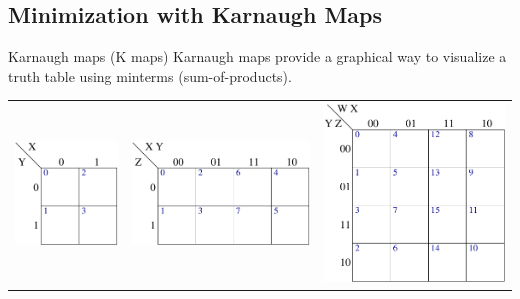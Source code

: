\subsection{Minimization with Karnaugh Maps}

\begin{frame}{Karnaugh maps (K maps)}
  Karnaugh maps provide a graphical way to visualize a truth table using minterms (sum-of-products).\\
  \begin{center}
    \begin{tabular}{ccc}
      \includegraphics[scale=0.5]{2VariableKMap} & \includegraphics[scale=0.5]{3VariableKMap} & \includegraphics[scale=0.5]{4VariableKMap} \\

\end{tabular}
\end{center}
\end{frame}
